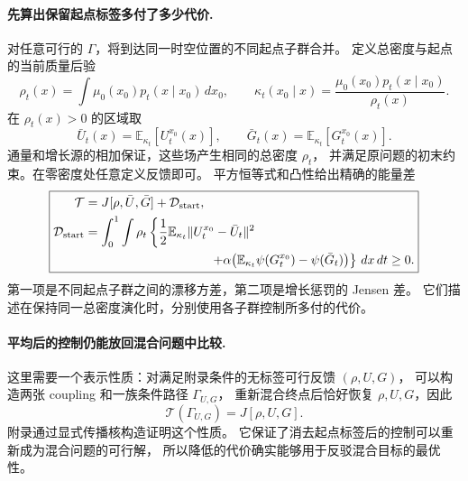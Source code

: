 \documentclass[UTF8,a4paper,11pt,fontset=fandol]{ctexart}
\begin{document}
\paragraph{先算出保留起点标签多付了多少代价.}
对任意可行的 $\Gamma$，将到达同一时空位置的不同起点子群合并。
定义总密度与起点的当前质量后验
\begin{equation}
\rho_t(x)=\int\mu_0(x_0)p_t(x\mid x_0)\,dx_0,
\qquad
\kappa_t(x_0\mid x)=\frac{\mu_0(x_0)p_t(x\mid x_0)}{\rho_t(x)}.
\label{eq:source-posterior}
\end{equation}
在 $\rho_t(x)>0$ 的区域取
\begin{equation}
\bar U_t(x)=\mathbb E_{\kappa_t}[U_t^{x_0}(x)],
\qquad
\bar G_t(x)=\mathbb E_{\kappa_t}[G_t^{x_0}(x)].
\label{eq:source-projected-controls}
\end{equation}
通量和增长源的相加保证，这些场产生相同的总密度 $\rho_t$，
并满足原问题的初末约束。在零密度处任意定义反馈即可。
平方恒等式和凸性给出精确的能量差
\begin{equation}
\boxed{
\begin{aligned}
\mathcal T&=J[\rho,\bar U,\bar G]+\mathcal D_{\mathrm{start}},\\
\mathcal D_{\mathrm{start}}
&=\int_0^1\int\rho_t
\left\{\frac12\mathbb E_{\kappa_t}
\|U_t^{x_0}-\bar U_t\|^2\right.\\
&\hspace{35mm}\left.
+\alpha\bigl(\mathbb E_{\kappa_t}\psi(G_t^{x_0})
-\psi(\bar G_t)\bigr)\right\}\,dx\,dt\ge0.
\end{aligned}
}
\label{eq:source-energy-gap}
\end{equation}
第一项是不同起点子群之间的漂移方差，第二项是增长惩罚的 Jensen 差。
它们描述在保持同一总密度演化时，分别使用各子群控制所多付的代价。

\paragraph{平均后的控制仍能放回混合问题中比较.}
这里需要一个表示性质：对满足附录条件的无标签可行反馈 $(\rho,U,G)$，
可以构造两张 coupling 和一族条件路径 $\Gamma_{U,G}$，
重新混合终点后恰好恢复 $\rho,U,G$，因此
\begin{equation}
\mathcal T(\Gamma_{U,G})=J[\rho,U,G].
\label{eq:feedback-representation-property}
\end{equation}
附录通过显式传播核构造证明这个性质。
它保证了消去起点标签后的控制可以重新成为混合问题的可行解，
所以降低的代价确实能够用于反驳混合目标的最优性。
\end{document}
